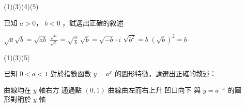 \begin{QUESTIONS}
\begin{QUESTION}
    \begin{QTAGS} \end{QTAGS}
    \begin{QANS}
        (1)(3)(4)(5)
    \end{QANS}
    \begin{QSOL}
    \end{QSOL}
    \begin{QEMPTYSPACE}
    \end{QEMPTYSPACE}
\end{QUESTION}
\begin{QUESTION}
    \begin{QBODY}
        已知 $a>0$， $b<0$ ，試選出正確的敘述
        \begin{QOPS}
            \QOP $\sqrt{a}\sqrt{b}=\sqrt{ab}$ 
            \QOP $\frac{\sqrt{a}}{\sqrt{b}}=\sqrt{\frac{a}{b}}$ 
            \QOP $\sqrt{b}=\sqrt{-b}\cdot i$ 
            \QOP $\sqrt{{{b}^{2}}}=b$ 
            \QOP ${{\left( \sqrt{b} \right)}^{2}}=b$ 
        \end{QOPS}
    \end{QBODY}
    \begin{QFROMS}
    \end{QFROMS}
    \begin{QTAGS} \end{QTAGS}
    \begin{QANS}
        (1)(3)(5)
    \end{QANS}
    \begin{QSOL}
    \end{QSOL}
    \begin{QEMPTYSPACE}
    \end{QEMPTYSPACE}
\end{QUESTION}
\begin{QUESTION}
    \begin{QBODY}
        已知 $0<a<1$ 對於指數函數 $y={{a}^{x}}$ 的圖形特徵，請選出正確的敘述：
        \begin{QOPS}
            \QOP 曲線均在 $y$ 軸右方
            \QOP 通過點 $\left( 0,1 \right)$
            \QOP 曲線由左而右上升
            \QOP 凹口向下
            \QOP 與 $y={{a}^{-x}}$ 的圖形對稱於 $y$ 軸            
        \end{QOPS}
    \end{QBODY}
    \begin{QFROMS}
    \end{QFROMS}
    \begin{QTAGS} \end{QTAGS}

\end{QUESTION}
\end{QUESTIONS}
